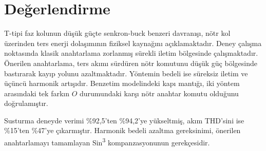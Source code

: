 \sekilsonrabaslik
\section{Değerlendirme}

T-tipi faz kolunun düşük güçte senkron-buck benzeri davranışı, nötr kol üzerinden ters enerji dolaşımının fiziksel kaynağını açıklamaktadır. Deney çalışma noktasında klasik anahtarlama zorlanmış sürekli iletim bölgesinde çalışmaktadır. Önerilen anahtarlama, ters akımı sürdüren nötr komutunu düşük güç bölgesinde bastırarak kayıp yolunu azaltmaktadır. Yöntemin bedeli ise süreksiz iletim ve üçüncü harmonik artışıdır. Benzetim modelindeki kapı mantığı, iki yöntem arasındaki tek farkın $O$ durumundaki karşı nötr anahtar komutu olduğunu doğrulamıştır.

Susturma deneyde verimi \%92,5'ten \%94,2'ye yükseltmiş, akım THD'sini ise \%15'ten \%47'ye çıkarmıştır. Harmonik bedeli azaltma gereksinimi, önerilen anahtarlamayı tamamlayan Sin\textsuperscript{3} kompanzasyonunun gerekçesidir.
